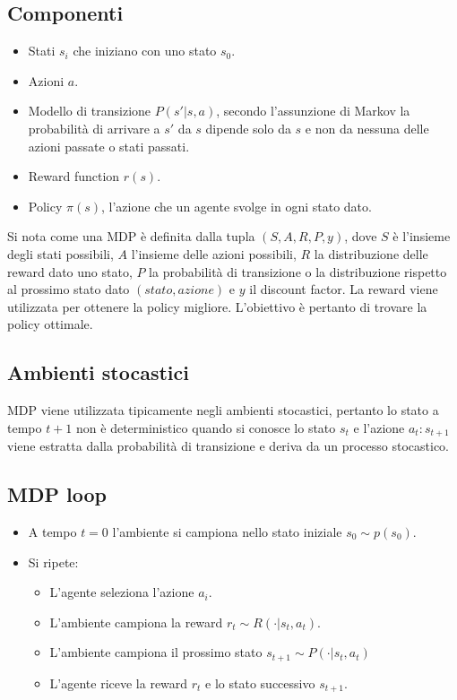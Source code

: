 	\subsection{Componenti}
	\begin{itemize}
		\item Stati $s_i$ che iniziano con uno stato $s_0$.
		\item Azioni $a$.
		\item Modello di transizione $P(s'|s,a)$, secondo l'assunzione di Markov la probabilit\`a di arrivare a $s'$ da $s$ dipende solo da $s$ e non da nessuna delle azioni passate o stati passati.
		\item Reward function $r(s)$.
		\item Policy $\pi(s)$, l'azione che un agente svolge in ogni stato dato.
	\end{itemize}
	Si nota come una MDP \`e definita dalla tupla $(S, A, R, P, y)$, dove $S$ \`e l'insieme degli stati possibili, $A$ l'insieme delle azioni possibili, $R$ la distribuzione delle reward dato uno stato, $P$ la probabilit\`a di transizione o la distribuzione rispetto al prossimo stato dato $(stato, azione)$ e $y$ il discount factor.
	La reward viene utilizzata per ottenere la policy migliore.
	L'obiettivo \`e pertanto di trovare la policy ottimale.

	\subsection{Ambienti stocastici}
	MDP viene utilizzata tipicamente negli ambienti stocastici, pertanto lo stato a tempo $t+1$ non \`e deterministico quando si conosce lo stato $s_t$ e l'azione $a_t:s_{t+1}$ viene estratta dalla probabilit\`a di transizione e deriva da un processo stocastico.

	\subsection{MDP loop}
	\begin{itemize}
		\item A tempo $t=0$ l'ambiente si campiona nello stato iniziale $s_0\sim p(s_0)$.
		\item Si ripete:
			\begin{itemize}
				\item L'agente seleziona l'azione $a_i$.
				\item L'ambiente campiona la reward $r_t\sim R(\cdot|s_t, a_t)$.
				\item L'ambiente campiona il prossimo stato $s_{t+1}\sim P(\cdot|s_t, a_t)$
				\item L'agente riceve la reward $r_t$ e lo stato successivo $s_{t+1}$.
			\end{itemize}
	\end{itemize}

